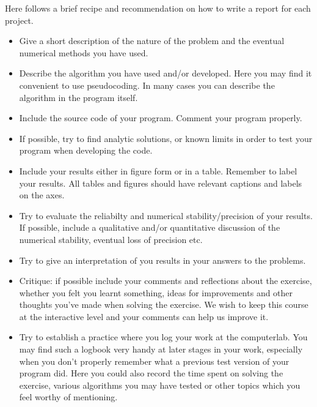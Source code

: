 \documentclass[%
oneside,                 %
final,                   %
10pt]{article}
\begin{document}
Here follows a brief recipe and recommendation on how to write a report for each
project.

\begin{itemize}
  \item Give a short description of the nature of the problem and the eventual  numerical methods you have used.

  \item Describe the algorithm you have used and/or developed. Here you may find it convenient to use pseudocoding. In many cases you can describe the algorithm in the program itself.

  \item Include the source code of your program. Comment your program properly.

  \item If possible, try to find analytic solutions, or known limits in order to test your program when developing the code.

  \item Include your results either in figure form or in a table. Remember to        label your results. All tables and figures should have relevant captions        and labels on the axes.

  \item Try to evaluate the reliabilty and numerical stability/precision of your results. If possible, include a qualitative and/or quantitative discussion of the numerical stability, eventual loss of precision etc.

  \item Try to give an interpretation of you results in your answers to  the problems.

  \item Critique: if possible include your comments and reflections about the  exercise, whether you felt you learnt something, ideas for improvements and  other thoughts you've made when solving the exercise. We wish to keep this course at the interactive level and your comments can help us improve it.

  \item Try to establish a practice where you log your work at the  computerlab. You may find such a logbook very handy at later stages in your work, especially when you don't properly remember  what a previous test version  of your program did. Here you could also record  the time spent on solving the exercise, various algorithms you may have tested or other topics which you feel worthy of mentioning.
\end{itemize}
\end{document}
